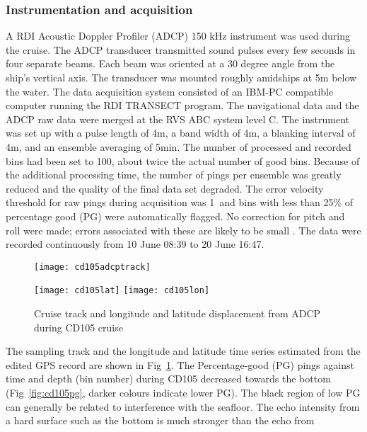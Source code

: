 \subsubsection{Instrumentation and acquisition}
A RDI Acoustic Doppler Profiler (ADCP) 150 kHz instrument was used
during the cruise.  The ADCP transducer transmitted sound pulses
every few seconds in four separate beams. Each beam was oriented
at a 30 degree angle from the ship's vertical axis. The transducer
was mounted roughly amidships at 5m below the water. The data
acquisition system consisted of an IBM-PC compatible computer
running the  RDI TRANSECT program. The navigational data and the
ADCP raw data were merged at the RVS ABC system level C. The
instrument was set up with a pulse length of 4m, a band width of
4m, a blanking interval of 4m, and an ensemble averaging of 5min.
The number of processed and recorded bins had been set to 100,
about twice the actual number of good bins. Because of the
additional processing time, the number of pings per ensemble was
greatly reduced and the quality of the final data set degraded.
The error velocity threshold for raw pings during acquisition was
1\vel\, and bins with less than 25\% of percentage good (PG) were
automatically flagged. No correction for pitch and roll were made;
errors associated with these are likely to be small
\cite{kosro85}. The data were recorded continuously from 10 June
08:39 to 20 June 16:47.
\begin{figure}[tbh]
  \centering
  \begin{minipage}{7cm}
  \texttt{[image: cd105adcptrack]}
  \end{minipage}
  \begin{minipage}{7cm}
  \texttt{[image: cd105lat]}
  \texttt{[image: cd105lon]}
  \end{minipage}
  \caption{Cruise track and longitude and latitude displacement from ADCP during
   CD105 cruise}
  \label{fig:cd105track}
\end{figure}
The sampling track and the longitude and latitude time series
estimated from the edited GPS record are shown in
Fig~\ref{fig:cd105track}. The Percentage-good (PG) pings against
time and depth (bin number) during CD105 decreased towards the
bottom (Fig~\ref{fig:cd105pg}, darker colours indicate lower PG).
The black region of low PG can generally be related to
interference with the seafloor. The echo intensity from a hard
surface such as the bottom is much stronger than the echo from
